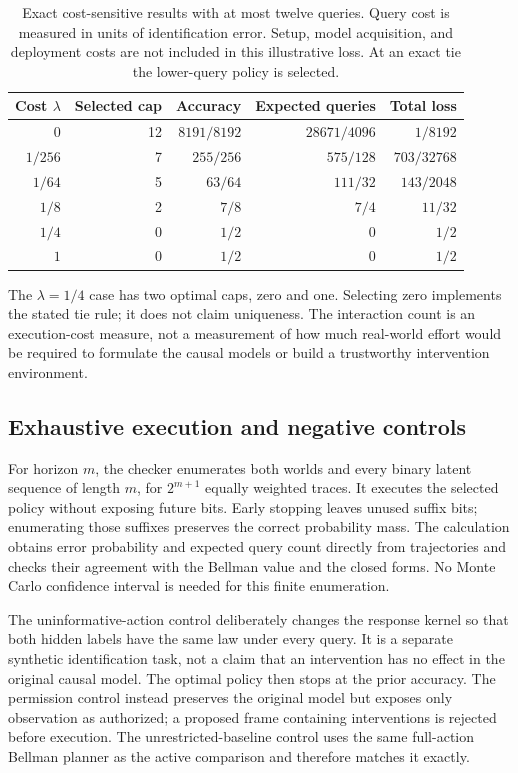 \documentclass[11pt,letterpaper]{article}
\theoremstyle{remark}\newtheorem{remark}{Remark}[section]
\begin{document}
\begin{table}[htbp]
\centering\small
\caption{Exact cost-sensitive results with at most twelve queries. Query cost is measured in units of identification error. Setup, model acquisition, and deployment costs are not included in this illustrative loss. At an exact tie the lower-query policy is selected.}
\label{tab:cost}
\begin{tabular}{@{}rrrrr@{}}
\toprule
Cost $\lambda$ & Selected cap & Accuracy & Expected queries & Total loss \\
\midrule
$0$ & 12 & $8191/8192$ & $28671/4096$ & $1/8192$ \\
$1/256$ & 7 & $255/256$ & $575/128$ & $703/32768$ \\
$1/64$ & 5 & $63/64$ & $111/32$ & $143/2048$ \\
$1/8$ & 2 & $7/8$ & $7/4$ & $11/32$ \\
$1/4$ & 0 & $1/2$ & $0$ & $1/2$ \\
$1$ & 0 & $1/2$ & $0$ & $1/2$ \\
\bottomrule
\end{tabular}
\end{table}
The $\lambda=1/4$ case has two optimal caps, zero and one. Selecting zero implements the stated tie rule; it does not claim uniqueness. The interaction count is an execution-cost measure, not a measurement of how much real-world effort would be required to formulate the causal models or build a trustworthy intervention environment.

\subsection{Exhaustive execution and negative controls}
For horizon $m$, the checker enumerates both worlds and every binary latent sequence of length $m$, for $2^{m+1}$ equally weighted traces. It executes the selected policy without exposing future bits. Early stopping leaves unused suffix bits; enumerating those suffixes preserves the correct probability mass. The calculation obtains error probability and expected query count directly from trajectories and checks their agreement with the Bellman value and the closed forms. No Monte Carlo confidence interval is needed for this finite enumeration.

The uninformative-action control deliberately changes the response kernel so that both hidden labels have the same law under every query. It is a separate synthetic identification task, not a claim that an intervention has no effect in the original causal model. The optimal policy then stops at the prior accuracy. The permission control instead preserves the original model but exposes only observation as authorized; a proposed frame containing interventions is rejected before execution. The unrestricted-baseline control uses the same full-action Bellman planner as the active comparison and therefore matches it exactly.
\end{document}
